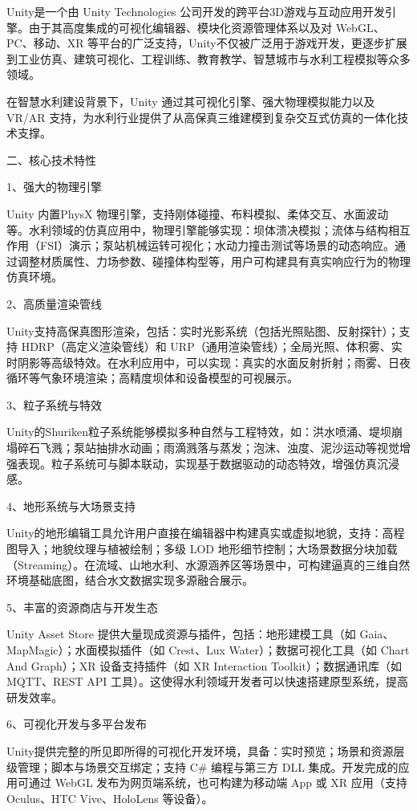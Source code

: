 Unity是一个由 Unity Technologies 公司开发的跨平台3D游戏与互动应用开发引擎。由于其高度集成的可视化编辑器、模块化资源管理体系以及对 WebGL、PC、移动、XR 等平台的广泛支持，Unity不仅被广泛用于游戏开发，更逐步扩展到工业仿真、建筑可视化、工程训练、教育教学、智慧城市与水利工程模拟等众多领域。

在智慧水利建设背景下，Unity 通过其可视化引擎、强大物理模拟能力以及 VR/AR 支持，为水利行业提供了从高保真三维建模到复杂交互式仿真的一体化技术支撑。

二、核心技术特性

1、强大的物理引擎

Unity 内置PhysX 物理引擎，支持刚体碰撞、布料模拟、柔体交互、水面波动等。水利领域的仿真应用中，物理引擎能够实现：坝体溃决模拟；流体与结构相互作用（FSI）演示；泵站机械运转可视化；水动力撞击测试等场景的动态响应。通过调整材质属性、力场参数、碰撞体构型等，用户可构建具有真实响应行为的物理仿真环境。

2、高质量渲染管线

Unity支持高保真图形渲染，包括：实时光影系统（包括光照贴图、反射探针）；支持 HDRP（高定义渲染管线）和 URP（通用渲染管线）；全局光照、体积雾、实时阴影等高级特效。在水利应用中，可以实现：真实的水面反射折射；雨雾、日夜循环等气象环境渲染；高精度坝体和设备模型的可视展示。

3、粒子系统与特效

Unity的Shuriken粒子系统能够模拟多种自然与工程特效，如：洪水喷涌、堤坝崩塌碎石飞溅；泵站抽排水动画；雨滴溅落与蒸发；泡沫、浊度、泥沙运动等视觉增强表现。粒子系统可与脚本联动，实现基于数据驱动的动态特效，增强仿真沉浸感。

4、地形系统与大场景支持

Unity的地形编辑工具允许用户直接在编辑器中构建真实或虚拟地貌，支持：高程图导入；地貌纹理与植被绘制；多级 LOD 地形细节控制；大场景数据分块加载（Streaming）。在流域、山地水利、水源涵养区等场景中，可构建逼真的三维自然环境基础底图，结合水文数据实现多源融合展示。

5、丰富的资源商店与开发生态

Unity Asset Store 提供大量现成资源与插件，包括：地形建模工具（如 Gaia、MapMagic）；水面模拟插件（如 Crest、Lux Water）；数据可视化工具（如 Chart And Graph）；XR 设备支持插件（如 XR Interaction Toolkit）；数据通讯库（如 MQTT、REST API 工具）。这使得水利领域开发者可以快速搭建原型系统，提高研发效率。

6、可视化开发与多平台发布

Unity提供完整的所见即所得的可视化开发环境，具备：实时预览；场景和资源层级管理；脚本与场景交互绑定；支持 C\# 编程与第三方 DLL 集成。开发完成的应用可通过 WebGL 发布为网页端系统，也可构建为移动端 App 或 XR 应用（支持 Oculus、HTC Vive、HoloLens 等设备）。

